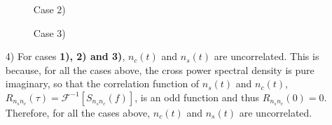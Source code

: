 \documentclass{assignment}
\begin{document}
\begin{sol}
\begin{itemize}
\begin{figure}[h]
            \caption{Case 2)}
            \caption{Case 3)}
        \end{figure}
        \item[4)] For cases \textbf{1), 2) and 3)}, $n_c(t)$ and $n_s(t)$ are uncorrelated. This is because, for all the cases above, the cross power spectral density is pure imaginary, so that the correlation function of $n_s(t)$ and $n_c(t)$, $R_{n_sn_c}(\tau)=\mathscr{F}^{-1}[S_{n_sn_c}(f)]$, is an odd function and thus $R_{n_sn_c}(0)=0$. Therefore, for all the cases above, $n_c(t)$ and $n_s(t)$ are uncorrelated.
    \end{itemize}
\end{sol}
\end{document}
